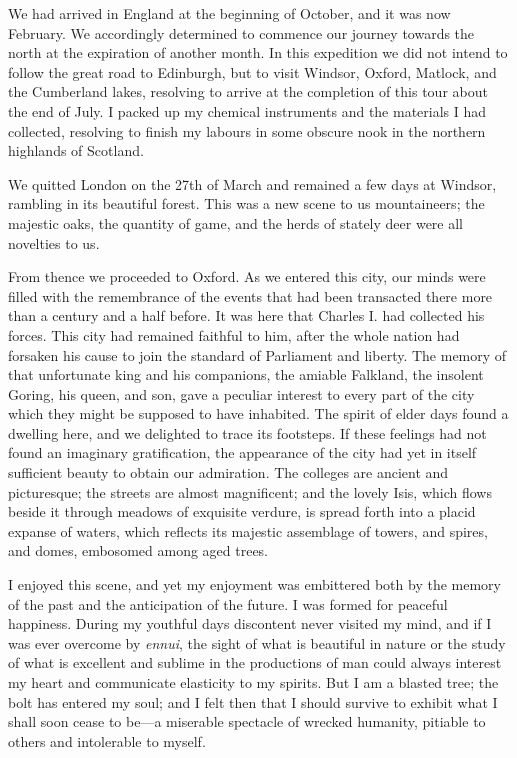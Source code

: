\documentclass[12pt,openright]{book}
\begin{document}
We had arrived in England at the beginning of October, and it was now February. We accordingly determined to commence our journey towards the north at the expiration of another month. In this expedition we did not intend to follow the great road to Edinburgh, but to visit Windsor, Oxford, Matlock, and the Cumberland lakes, resolving to arrive at the completion of this tour about the end of July. I packed up my chemical instruments and the materials I had collected, resolving to finish my labours in some obscure nook in the northern highlands of Scotland.

We quitted London on the 27th of March and remained a few days at Windsor, rambling in its beautiful forest. This was a new scene to us mountaineers; the majestic oaks, the quantity of game, and the herds of stately deer were all novelties to us.

From thence we proceeded to Oxford. As we entered this city, our minds were filled with the remembrance of the events that had been transacted there more than a century and a half before. It was here that Charles I. had collected his forces. This city had remained faithful to him, after the whole nation had forsaken his cause to join the standard of Parliament and liberty. The memory of that unfortunate king and his companions, the amiable Falkland, the insolent Goring, his queen, and son, gave a peculiar interest to every part of the city which they might be supposed to have inhabited. The spirit of elder days found a dwelling here, and we delighted to trace its footsteps. If these feelings had not found an imaginary gratification, the appearance of the city had yet in itself sufficient beauty to obtain our admiration. The colleges are ancient and picturesque; the streets are almost magnificent; and the lovely Isis, which flows beside it through meadows of exquisite verdure, is spread forth into a placid expanse of waters, which reflects its majestic assemblage of towers, and spires, and domes, embosomed among aged trees.

I enjoyed this scene, and yet my enjoyment was embittered both by the memory of the past and the anticipation of the future. I was formed for peaceful happiness. During my youthful days discontent never visited my mind, and if I was ever overcome by \textit{ennui}, the sight of what is beautiful in nature or the study of what is excellent and sublime in the productions of man could always interest my heart and communicate elasticity to my spirits. But I am a blasted tree; the bolt has entered my soul; and I felt then that I should survive to exhibit what I shall soon cease to be—a miserable spectacle of wrecked humanity, pitiable to others and intolerable to myself.
\end{document}
